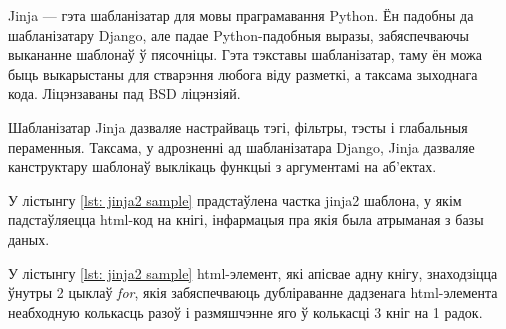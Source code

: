 Jinja --- гэта шабланізатар для мовы праграмавання Python. Ён падобны да шабланізатару Django, але падае Python-падобныя выразы, забяспечваючы выкананне шаблонаў ў пясочніцы. Гэта тэкставы шабланізатар, таму ён можа быць выкарыстаны для стварэння любога віду разметкі, а таксама зыходнага кода. Ліцэнзаваны пад BSD ліцэнзіяй.

Шабланізатар Jinja дазваляе настрайваць тэгі, фільтры, тэсты і глабальныя пераменныя. Таксама, у адрозненні ад шабланізатара Django, Jinja дазваляе канструктару шаблонаў выклікаць функцыі з аргументамі на аб'ектах.

У лістынгу \ref{lst: jinja2 sample} прадстаўлена частка jinja2 шаблона, у якім
падстаўляецца html-код на кнігі, інфармацыя пра якія была атрыманая з базы даных.




У лістынгу \ref{lst: jinja2 sample} html-элемент, які апісвае адну кнігу,
знаходзіцца ўнутры 2 цыклаў \textit{for}, якія забяспечваюць дубліраванне
дадзенага html-элемента неабходную колькасць разоў і размяшчэнне яго
ў колькасці 3 кніг на 1 радок.
